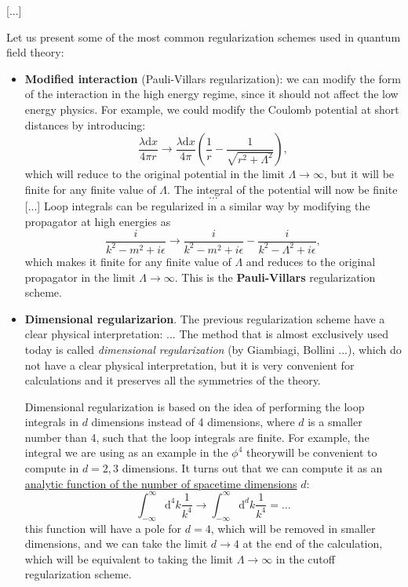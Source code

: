     [...]

Let us present some of the most common regularization schemes used in quantum field theory:
\begin{itemize}
    \item \textbf{Modified interaction} (Pauli-Villars regularization): we can modify the form of the interaction in the high energy regime, since it should not affect the low energy physics. For example, we could modify the Coulomb potential at short distances by introducing:
          \[
              \frac{\lambda \mathrm{d} x}{4 \pi r} \to \frac{\lambda \mathrm{d} x}{4 \pi} \left( \frac{1}{r} - \frac{1}{\sqrt{r^2 + \Lambda^2}}\right),
          \]
          which will reduce to the original potential in the limit \(\Lambda \to \infty\), but it will be finite for any finite value of \(\Lambda\). The integral of the potential will now be finite
          \[
              \dots
          \]
          [...]
          Loop integrals can be regularized in a similar way by modifying the propagator at high energies as
          \[
              \frac{i}{k^2 - m^2 + i \epsilon} \to \frac{i}{k^2 - m^2 + i \epsilon} - \frac{i}{k^2 - \Lambda^2 + i \epsilon},
          \]
          which makes it finite for any finite value of \(\Lambda\) and reduces to the original propagator in the limit \(\Lambda \to \infty\). This is the \textbf{Pauli-Villars} regularization scheme.

    \item \textbf{Dimensional regularizarion}. The previous regularization scheme have a clear physical interpretation: ...
          The method that is almost exclusively used today is called \textit{dimensional regularization} (by Giambiagi, Bollini ...), which do not have a clear physical interpretation, but it is very convenient for calculations and it preserves all the symmetries of the theory.

          Dimensional regularization is based on the idea of performing the loop integrals in \(d\) dimensions instead of 4 dimensions, where \(d\) is a smaller number than 4, such that the loop integrals are finite. For example, the integral we are using as an example in the \(\phi^4\) theorywill be convenient to compute in \(d = 2,3\) dimensions. It turns out that we can compute it as an \uline{analytic function of the number of spacetime dimensions} \(d\):
          \[
              \int_{-\infty}^{\infty} \mathrm{d}^4 k \frac{1}{k^4} \to \int_{-\infty}^{\infty} \mathrm{d}^d k \frac{1}{k^4} = \dots
          \]
          this function will have a pole for \(d=4\), which will be removed in smaller dimensions, and we can take the limit \(d \to 4\) at the end of the calculation, which will be equivalent to taking the limit \(\Lambda \to \infty\) in the cutoff regularization scheme.


\end{itemize}
